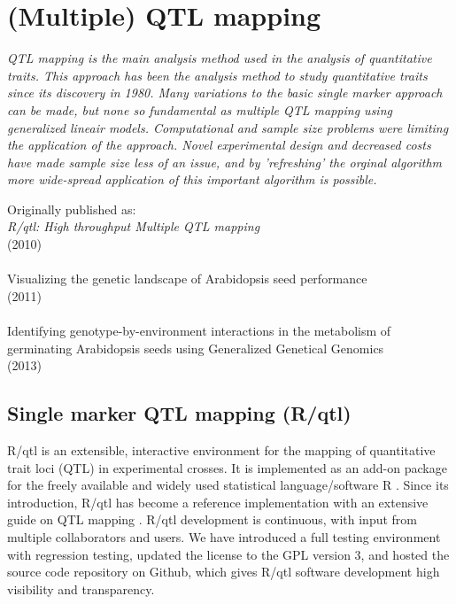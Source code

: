 \chapter{(Multiple) QTL mapping}
\label{chap:mqm}

\emph{QTL mapping is the main analysis method used in the analysis of quantitative traits. This 
approach has been the analysis method to study quantitative traits since its discovery in 1980. 
Many variations to the basic single marker approach can be made, but none so fundamental as 
multiple QTL mapping using generalized lineair models. Computational and sample size problems 
were limiting the application of the approach. Novel experimental design and decreased costs 
have made sample size less of an issue, and by 'refreshing' the orginal algorithm more 
wide-spread application of this important algorithm is possible.}
\null
\vfill

\begin{myexampleblock}{Originally published as:}
  \\
  \emph{R/qtl: High throughput Multiple QTL mapping}\\
   (2010) \\

  \\
  Visualizing the genetic landscape of Arabidopsis seed performance\\
   (2011)\\

  \\
  Identifying genotype-by-environment interactions in the metabolism of germinating Arabidopsis seeds using 
  Generalized Genetical Genomics\\
   (2013)
\end{myexampleblock}

\newpage

\section{Single marker QTL mapping (R/qtl)}
R/qtl is an extensible, interactive environment for the mapping of quantitative trait loci (QTL) 
in experimental crosses. It is implemented as an add-on package for the freely available and 
widely used statistical language/software R \cite{R:2009}. Since its introduction, R/qtl 
\cite{Broman:2003} has become a reference implementation with an extensive guide on QTL mapping 
\cite{RQTLGuide:2009}. R/qtl development is continuous, with input from multiple collaborators 
and users.  We have introduced a full testing environment with regression testing, updated the 
license to the GPL version 3, and hosted the source code repository on Github, which gives R/qtl 
software development high visibility and transparency. 


